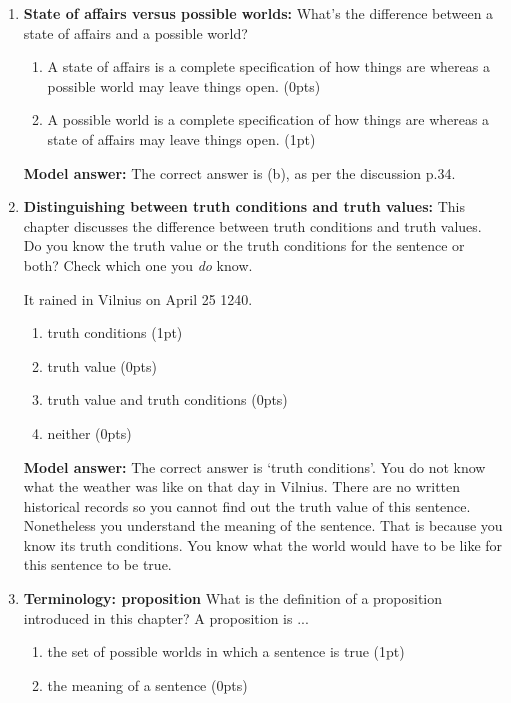 \documentclass[a4,11pt]{article}
\begin{document}
\begin{enumerate}[leftmargin = 12pt]
  \item {\bf State of affairs versus possible worlds:} What's the difference between a state of affairs and a possible world?

      \begin{enumerate}[noitemsep]
        \item A state of affairs is a complete specification of how things are whereas a possible world may leave things open. (0pts)
	\item A possible world is a complete specification of how things are whereas a state of affairs may leave things open. (1pt)
         \end{enumerate}
         
 {\bf Model answer:} The correct answer is (b), as per the discussion p.34.
          
      \item { \bf Distinguishing between truth conditions and truth values:} This chapter discusses the difference between truth conditions and truth values. Do you know the truth value or the truth conditions for the sentence or both? Check which one you \textit{do} know.

\begin{exe}
\ex It rained in Vilnius on April 25 1240.
\end{exe}

       \begin{enumerate}[noitemsep]
       \item truth conditions (1pt)
        \item truth value (0pts)
        \item truth value and truth conditions (0pts)
        \item neither (0pts)
         \end{enumerate}

{\bf Model answer:} The correct answer is `truth conditions'. You do not know what the weather was like on that day in Vilnius. There are no written historical records so you cannot find out the truth value of this sentence. Nonetheless you understand the meaning of the sentence. That is because you know its truth conditions. You know what the world would have to be like for this sentence to be true.  


   \item {\bf Terminology: proposition}  What is the definition of a proposition introduced in this chapter? A proposition is ...
       \begin{enumerate}[noitemsep]
       \item the set of possible worlds in which a sentence is true (1pt) 
        \item the meaning of a sentence (0pts)
   \end{enumerate}
  

\end{enumerate}
\end{document}
